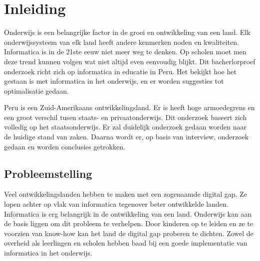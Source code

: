 
\chapter{Inleiding}
\label{ch:inleiding}

Onderwijs is een belangrijke factor in de groei en ontwikkeling van een land. Elk onderwijssysteem van elk land heeft andere kenmerken noden en kwaliteiten. Informatica is in de 21ste eeuw niet meer weg te denken. Op scholen moet men deze trend kunnen volgen wat niet altijd even eenvoudig blijkt. Dit bacherlorproef onderzoek richt zich op informatica in educatie in Peru. Het bekijkt hoe het gestaan is met informatica in het onderwijs, en er worden suggesties tot optimalisatie gedaan.

Peru is een Zuid-Amerikaans ontwikkelingsland. Er is heeft hoge armoedegrens en een groot verschil tusen staats- en privaatonderwijs. Dit onderzoek baseert zich volledig op het staatsonderwijs. Er zal duidelijk onderzoek gedaan worden naar de huidige stand van zaken. Daarna wordt er, op basis van interview, onderzoek gedaan en worden conclusies getrokken.



\section{Probleemstelling}
\label{sec:probleemstelling}
Veel ontwikkelingslanden hebben te maken met een zogenaamde digital gap. Ze lopen achter op vlak van informatica tegenover beter ontwikkelde landen. Informatica is erg belangrijk in de ontwikkeling van een land.  Onderwijs kan aan de basis liggen om dit probleem te verhelpen. Door kinderen op te leiden en ze te voorzien van know-how kan het land de digital gap proberen te dichten. Zowel de overheid als leerlingen en scholen hebben baad bij een goede implementatie van informatica in het onderwijs. 

